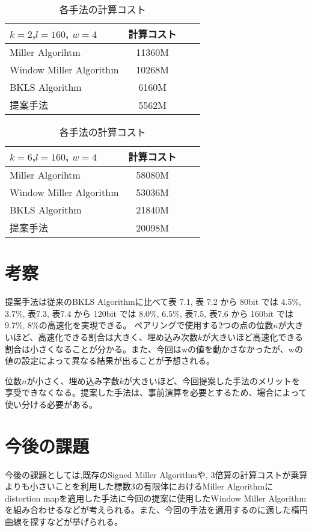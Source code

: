 \begin{table}[htbp]
 \begin{center}
  \begin{tabular}{|l|c|c|c|}
  \hline
  $k=2$,$l=160$, $w=4$ & 計算コスト \\
  \hline
  Miller Algorihtm & 11360M \\
  \hline
  Window Miller Algorithm & 10268M \\
  \hline
  BKLS Algorithm &  6160M \\
  \hline
  提案手法 & 5562M \\
  \hline
  \end{tabular}
 \end{center}
 \caption{各手法の計算コスト}
\end{table}

\begin{table}[htbp]
 \begin{center}
  \begin{tabular}{|l|c|c|c|}
  \hline
  $k=6$,$l=160$, $w=4$ & 計算コスト \\
  \hline
  Miller Algorihtm & 58080M \\
  \hline
  Window Miller Algorithm & 53036M \\
  \hline
  BKLS Algorithm &  21840M \\
  \hline
  提案手法 & 20098M \\
  \hline
  \end{tabular}
 \end{center}
 \caption{各手法の計算コスト}
\end{table}

\par
\par
\section{考察}

提案手法は従来のBKLS Algorithmに比べて表 7.1, 表 7.2 から 80bit では 4.5\%, 3.7\%, 表7.3, 表7.4 から 120bit では 8.0\%, 6.5\%, 表7.5, 表7.6 から 160bit では 9.7\%, 8\%の高速化を実現できる。
ペアリングで使用する2つの点の位数$n$が大きいほど、高速化できる割合は大きく、埋め込み次数$k$が大きいほど高速化できる割合は小さくなることが分かる。また、今回はwの値を動かさなかったが、wの値の設定によって異なる結果が出ることが予想される。
\par
位数$n$が小さく、埋め込み字数$k$が大きいほど、今回提案した手法のメリットを享受できなくなる。提案した手法は、事前演算を必要とするため、場合によって使い分ける必要がある。

\section{今後の課題}
今後の課題としては,既存のSigned Miller Algorithmや, 3倍算の計算コストが乗算よりも小さいことを利用した標数3の有限体におけるMiller Algorithmにdistortion mapを適用した手法に今回の提案に使用したWindow Miller Algorithmを組み合わせるなどが考えられる。また、今回の手法を適用するのに適した楕円曲線を探すなどが挙げられる。
